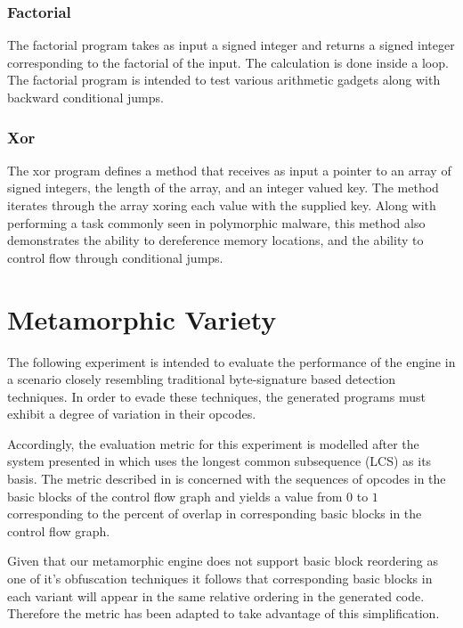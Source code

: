 \documentclass[finalcopy,short]{srpaper}
\begin{document}
            \subsubsection{Factorial}

                The factorial program takes as input a signed integer and
                returns a signed integer corresponding to the factorial of the
                input. The calculation is done inside a loop. The factorial
                program is intended to test various arithmetic gadgets along
                with backward conditional jumps.

            \subsubsection{Xor}

                The xor program defines a method that receives as input a
                pointer to an array of signed integers, the length of the array,
                and an integer valued key. The method iterates through the array
                xoring each value with the supplied key. Along with performing a
                task commonly seen in polymorphic malware, this method also
                demonstrates the ability to dereference memory locations, and
                the ability to control flow through conditional jumps.
            
    \section{Metamorphic Variety}
        
        The following experiment is intended to evaluate the performance of the
        engine in a scenario closely resembling traditional byte-signature based
        detection techniques. In order to evade these techniques, the generated
        programs must exhibit a degree of variation in their opcodes.

        Accordingly, the evaluation metric for this experiment is modelled after
        the system presented in \cite{cfg_lcs} which uses the longest common
        subsequence (LCS) as its basis. The metric described in \cite{cfg_lcs}
        is concerned with the sequences of opcodes in the basic blocks of the
        control flow graph and yields a value from $0$ to $1$ corresponding to
        the percent of overlap in corresponding basic blocks in the control flow
        graph.
        
        Given that our metamorphic engine does not support basic block
        reordering as one of it's obfuscation techniques it follows that
        corresponding basic blocks in each variant will appear in the same
        relative ordering in the generated code. Therefore the metric has been
        adapted to take advantage of this simplification.
\end{document}
